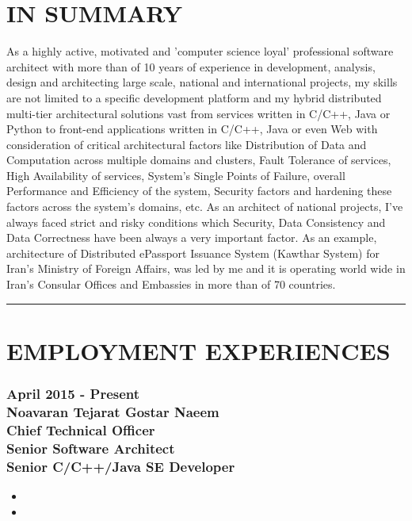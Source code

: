 \documentclass[10pt,a4paper]{article}
\begin{document}
\thispagestyle{fancy}

\section{IN SUMMARY}
As a highly active, motivated and 'computer science loyal' professional software architect with more than of 10 years of experience in development, analysis, design and architecting large scale, national and international projects, my skills are not limited to a specific development platform and my hybrid distributed multi-tier architectural solutions vast from services written in C/C++, Java or Python to front-end applications written in C/C++, Java or even Web with consideration of critical architectural factors like Distribution of Data and Computation across multiple domains and clusters, Fault Tolerance of services, High Availability of services, System's Single Points of Failure, overall Performance and Efficiency of the system, Security factors and hardening these factors across the system's domains, etc. As an architect of national projects, I've always faced strict and risky conditions which Security, Data Consistency and Data Correctness have been always a very important factor. As an example, architecture of Distributed ePassport Issuance System (Kawthar System) for Iran's Ministry of Foreign Affairs, was led by me and it is operating world wide in Iran's Consular Offices and Embassies in more than of 70 countries.

\rule {15cm}{0.4pt}

\section{EMPLOYMENT EXPERIENCES}

\subsubsection{\textnormal {April 2015 - Present} \\ \textnormal {Noavaran Tejarat Gostar Naeem} \\ Chief Technical Officer \\ Senior Software Architect \\ Senior C/C++/Java SE Developer}
  \setlength{\leftskip}{0.5cm}
  \setlength{\rightskip}{1cm}
  \lipsum[2]
  \begin{itemize}
    \item \lipsum[1]
    \item \lipsum[1]
  \end{itemize}
  \setlength{\leftskip}{0pt}
  \setlength{\rightskip}{0cm}
	  
\end{document}
